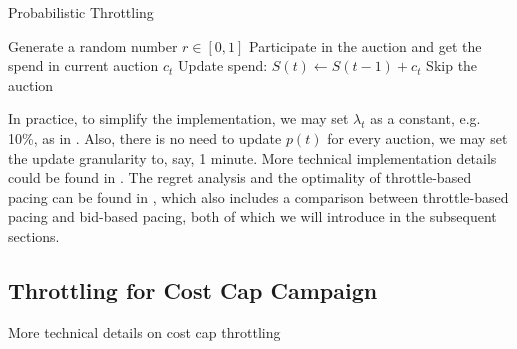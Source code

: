 \documentclass[../main.tex]{subfiles}
\begin{document}
\begin{section}{Probabilistic Throttling}
\begin{algorithm}
\begin{algorithmic}[1]
				\State Generate a random number $r \in [0, 1]$
				\State Participate in the auction and get the spend in current auction $c_t$
				\State Update spend: $S(t) \gets S(t-1) + c_t$
				\Else
				\State Skip the auction
				\EndIf
				\EndFor
				
			\end{algorithmic}
		\end{algorithm}
	In practice, to simplify the implementation, we may set \(\lambda_t\) as a constant, e.g. 10\%, as in \cite{LinkedInPacing}.  Also, there is no need to update $p(t)$ for every auction, we may set the update granularity to, say, 1 minute.  More technical implementation details could be found in \cite{LinkedInPacing}.  The regret analysis and the optimality of throttle-based pacing can be found in \cite{chen2024dynamic}, which also includes a comparison between throttle-based pacing and bid-based pacing, both of which we will introduce in the subsequent sections.


\subsection*{Throttling for Cost Cap Campaign}
More technical details on cost cap throttling \cite{xu2015smart}


\end{section}
	
	
\end{document}
